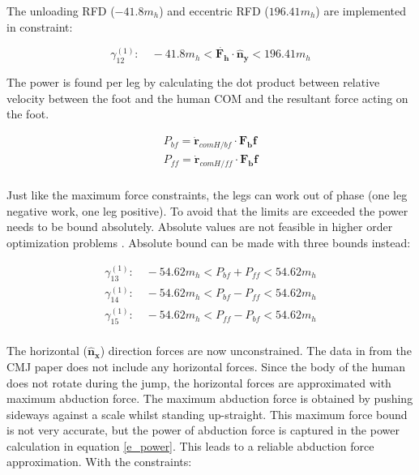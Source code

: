 \documentclass[default,iicol]{sn-jnl}
\begin{document}
The unloading RFD ($-41.8 m_h$) and eccentric RFD ($196.41 m_h$) are implemented in constraint:

\begin{equation}
    \gamma_{12}^{(1)}: \quad  -41.8 m_h < \dot{\mathbf{F_h}} \cdot \mathbf{\hat n_y} < 196.41 m_h  
\end{equation}

The power is found per leg by calculating the dot product between relative velocity between the foot and the human COM and the resultant force acting on the foot. 

\begin{equation}\label{e_power}
    \begin{array}{c}
         P_{bf} = \mathbf{\dot r}_{comH/bf} \cdot \mathbf{F_bf}  \\
         P_{ff} = \mathbf{\dot r}_{comH/ff} \cdot \mathbf{F_bf}  \\
    \end{array}
\end{equation}

Just like the maximum force constraints, the legs can work out of phase (one leg negative work, one leg positive). To avoid that the limits are exceeded the power needs to be bound absolutely. Absolute values are not feasible in higher order optimization problems \cite{kelly_introduction_2017}. Absolute bound can be made with three bounds instead:

\begin{equation}
    \begin{array}{c}
         \gamma_{13}^{(1)}:\quad  -54.62 m_h < P_{bf} + P_{ff} < 54.62 m_h  \\
         \gamma_{14}^{(1)}:\quad  -54.62 m_h < P_{bf} - P_{ff} < 54.62 m_h  \\
         \gamma_{15}^{(1)}:\quad  -54.62 m_h < P_{ff} - P_{bf} < 54.62 m_h  \\
    \end{array}
\end{equation}

The horizontal ($\mathbf{\hat n_x}$) direction forces are now unconstrained. The data in from the CMJ paper does not include any horizontal forces. Since the body of the human does not rotate during the jump, the horizontal forces are approximated with maximum abduction force. The maximum abduction force is obtained by pushing sideways against a scale whilst standing up-straight. This maximum force bound is not very accurate, but the power of abduction force is captured in the power calculation in equation \ref{e_power}. This leads to a reliable abduction force approximation. With the constraints:
\end{document}
